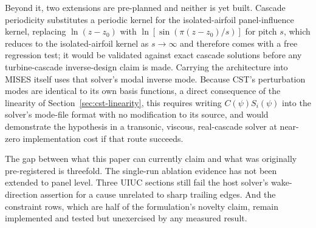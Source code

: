 Beyond it, two extensions are pre-planned and neither is yet built. Cascade
periodicity substitutes a periodic kernel for the isolated-airfoil
panel-influence kernel, replacing $\ln(z-z_0)$ with $\ln[\sin(\pi(z-z_0)/s)]$
for pitch $s$, which reduces to the isolated-airfoil kernel as $s\to\infty$
and therefore comes with a free regression test; it would be validated against
exact cascade solutions before any turbine-cascade inverse-design claim is
made. Carrying the architecture into MISES itself uses that solver's modal
inverse mode. Because CST's perturbation modes are identical to its own basis
functions, a direct consequence of the linearity of
Section~\ref{sec:cst-linearity}, this requires writing $C(\psi)S_i(\psi)$ into
the solver's mode-file format with no modification to its source, and would
demonstrate the hypothesis in a transonic, viscous, real-cascade solver at
near-zero implementation cost if that route succeeds.

The gap between what this paper can currently claim and what was originally
pre-registered is threefold. The single-run ablation evidence has not been
extended to panel level. Three UIUC sections still fail the host solver's
wake-direction assertion for a cause unrelated to sharp trailing edges. And
the constraint rows, which are half of the formulation's novelty claim, remain
implemented and tested but unexercised by any measured result.
